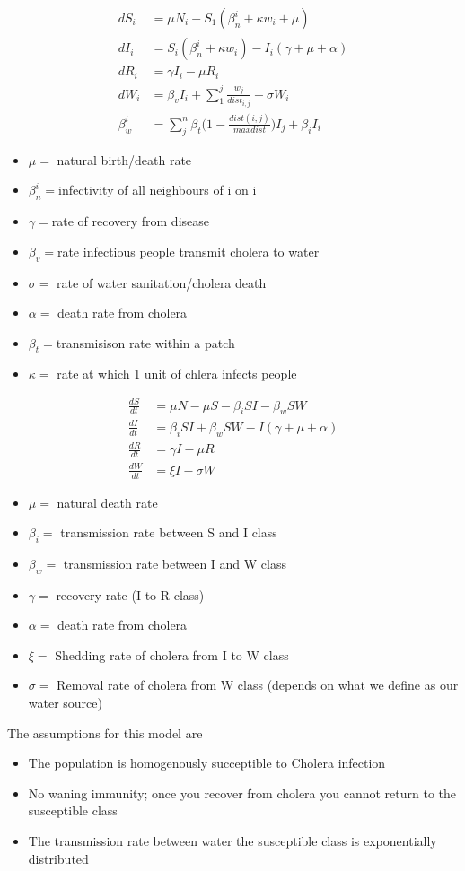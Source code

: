 \documentclass[12pt]{article}\usepackage[]{graphicx}\usepackage[]{color}
\begin{document}
\begin{align*}
dS_i&=\mu N_i-S_1(\beta_n^i+\kappa w_i+\mu)\\
dI_i&=S_i(\beta_n^i+\kappa w_i)-I_i(\gamma+\mu+\alpha)\\
dR_i&=\gamma I_i-\mu R_i\\
dW_i&=\beta_v I_i+\sum_{1}^{j} \frac{w_j}{dist_{i,j}} -\sigma W_i\\
\beta_w^i&=\sum_{j}^{n}{\beta_t\Big(1-\frac{dist(i,j)}{max dist}\Big)I_j}+\beta_iI_i
\end{align*}
\begin{itemize}
  \item $\mu=$ natural birth/death rate
  \item $\beta_n^i=$infectivity of all neighbours of i on i
  \item$\gamma=$rate of recovery from disease
  \item$\beta_v=$rate infectious people transmit cholera to water
  \item$\sigma=$ rate of water sanitation/cholera death
  \item$\alpha=$ death rate from cholera
  \item$\beta_t=$transmisison rate within a patch
  \item $\kappa=$ rate at which 1 unit of chlera infects people
\end{itemize}
\begin{linenomath}
	\begin{align*}
		\frac{dS}{dt}&= \mu N - \mu S - \beta_i SI - \beta_w S W  \\
		\frac{dI}{dt}&= \beta_i S I + \beta_w S W - I (\gamma + \mu + \alpha) \\
		\frac{dR}{dt}&= \gamma I - \mu R \\
		\frac{dW}{dt}&= \xi I  - \sigma W
	\end{align*}
\end{linenomath}
\begin{itemize}
    \item$\mu=$ natural death rate
    \item$\beta_i=$ transmission rate between S and I class
    \item$\beta_w=$ transmission rate between I and W class
    \item$\gamma=$ recovery rate (I to R class)
    \item$\alpha=$ death rate from cholera
    \item$\xi=$ Shedding rate of cholera from I to W class
    \item$\sigma=$	Removal rate of cholera from W class (depends on what we define as our water source)
\end{itemize}
The assumptions for this model are
\begin{itemize}
    \item The population is homogenously succeptible to Cholera infection
    \item No waning immunity; once you recover from cholera you cannot return to the susceptible class
    \item The transmission rate between water the susceptible class  is exponentially distributed
\end{itemize}
\end{document}
